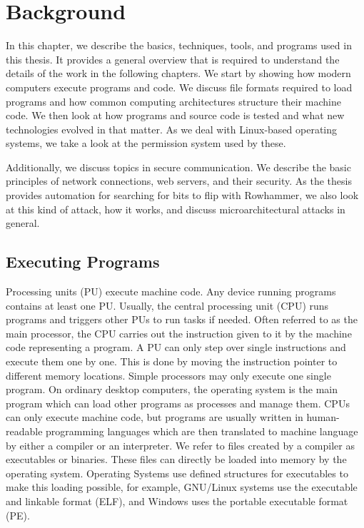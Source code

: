 \chapter{Background}\label{sec:general}

In this chapter, we describe the basics, techniques, tools, and programs used in
this thesis. It provides a general overview that is required to understand the
details of the work in the following chapters. We start by showing how modern
computers execute programs and code. We discuss file formats required to load
programs and how common computing architectures structure their machine code. We
then look at how programs and source code is tested and what new technologies
evolved in that matter. As we deal with Linux-based operating systems, we take a
look at the permission system used by these.

Additionally, we discuss topics in secure communication. We describe the basic
principles of network connections, web servers, and their security. As the
thesis provides automation for searching for bits to flip with Rowhammer, we
also look at this kind of attack, how it works, and discuss microarchitectural
attacks in general.

\section{Executing Programs}

Processing units (PU) execute machine code. Any device running programs contains
at least one PU. Usually, the central processing unit (CPU) runs programs and
triggers other PUs to run tasks if needed. Often referred to as the main
processor, the CPU carries out the instruction given to it by the machine code
representing a program. A PU can only step over single instructions and execute
them one by one. This is done by moving the instruction pointer to different
memory locations. Simple processors may only execute one single program. On
ordinary desktop computers, the operating system is the main program which can
load other programs as processes and manage them. CPUs can only execute machine
code, but programs are usually written in human-readable programming languages
which are then translated to machine language by either a compiler or an
interpreter. We refer to files created by a compiler as executables or binaries.
These files can directly be loaded into memory by the operating system.
Operating Systems use defined structures for executables to make this loading
possible, for example, GNU/Linux systems use the executable and linkable format
(ELF), and Windows uses the portable executable format (PE).

